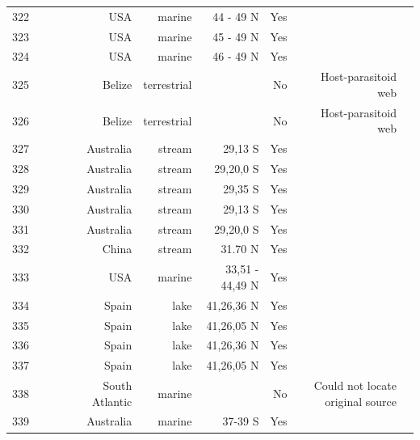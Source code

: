 \documentclass[12pt]{article}
\begin{document}
\begin{landscape}
\begin{table}[h!]
\begin{tabular}{rrrrrrrrr}
      322   & ~\citet{GlobalWeb} & ~\citet{Ruzicka2012} & USA   & marine & 44 - 49 N & Yes   &       &  \\
      323   & ~\citet{GlobalWeb} & ~\citet{Ruzicka2012} & USA   & marine & 45 - 49 N & Yes   &       &  \\
      324   & ~\citet{GlobalWeb} & ~\citet{Ruzicka2012} & USA   & marine & 46 - 49 N & Yes   &       &  \\
      325   & ~\citet{GlobalWeb} & ~\citet{Lewis2002} & Belize & terrestrial &       & No    & Host-parasitoid web &  \\
      326   & ~\citet{GlobalWeb} & ~\citet{Lewis2002} & Belize & terrestrial &       & No    & Host-parasitoid web &  \\
      327   & ~\citet{GlobalWeb} & ~\citet{Kelleway2010} & Australia & stream & 29,13 S & Yes   &       &  \\
      328   & ~\citet{GlobalWeb} & ~\citet{Kelleway2010} & Australia & stream & 29,20,0 S & Yes   &       &  \\
      329   & ~\citet{GlobalWeb} & ~\citet{Kelleway2010} & Australia & stream & 29,35 S & Yes   &       &  \\
      330   & ~\citet{GlobalWeb} & ~\citet{Kelleway2010} & Australia & stream & 29,13 S & Yes   &       &  \\
      331   & ~\citet{GlobalWeb} & ~\citet{Kelleway2010} & Australia & stream & 29,20,0 S & Yes   &       &  \\
      332   & ~\citet{GlobalWeb} & ~\citet{Huang2008} & China & stream & 31.70 N & Yes   &       &  \\
      333   & ~\citet{GlobalWeb} & ~\citet{Link2002} & USA   & marine & 33,51 - 44,49 N & Yes   &       &  \\
      334   & ~\citet{GlobalWeb} & ~\citet{Alcorlo2001} & Spain & lake  & 41,26,36 N & Yes   &       &  \\
      335   & ~\citet{GlobalWeb} & ~\citet{Alcorlo2001} & Spain & lake  & 41,26,05 N & Yes   &       &  \\
      336   & ~\citet{GlobalWeb} & ~\citet{Alcorlo2001} & Spain & lake  & 41,26,36 N & Yes   &       &  \\
      337   & ~\citet{GlobalWeb} & ~\citet{Alcorlo2001} & Spain & lake  & 41,26,05 N & Yes   &       &  \\
      338   & ~\citet{GlobalWeb} & ~\citet{Torres2013} & South Atlantic & marine &       & No    & Could not locate original source &  \\
      339   & ~\citet{GlobalWeb} & ~\citet{Bulman2001} & Australia & marine & 37-39 S & Yes   &       &  \\

\end{tabular}
\end{table}
\end{landscape}
\end{document}
